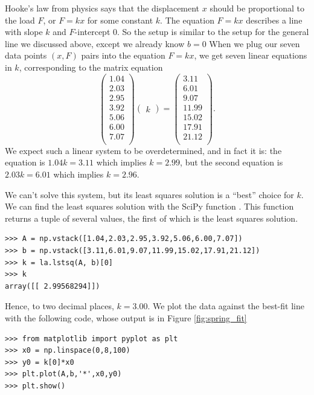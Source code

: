 Hooke's law from physics says that the displacement $x$ should be proportional to the load $F$, or $F = kx$ for some constant $k$.
The equation $F=kx$ describes a line with slope $k$ and $F$-intercept 0.
So the setup is similar to the setup for the general line we discussed above, except we already know $b=0$
When we plug our seven data points $(x,F)$ pairs into the equation $F=kx$, we get seven linear equations in $k$, corresponding to the matrix equation
\[
\begin{pmatrix}
1.04\\
2.03\\
2.95\\
3.92\\
5.06\\
6.00\\
7.07\\
\end{pmatrix}
\begin{pmatrix}k\end{pmatrix} =
\begin{pmatrix}
3.11 \\
6.01\\
9.07\\
11.99\\
15.02\\
17.91\\
21.12\\
\end{pmatrix}.
\]
We expect such a linear system to be overdetermined, and in fact it is: the equation is $1.04k = 3.11$ which implies $k=2.99$, but the second equation is $2.03k = 6.01$ which implies $k=2.96$.

We can't solve this system, but its least squares solution is a ``best'' choice for $k$.
We can find the least squares solution with the SciPy function . 
This function returns a tuple of several values, the first of which is the least squares solution.
\begin{lstlisting}
>>> A = np.vstack([1.04,2.03,2.95,3.92,5.06,6.00,7.07])
>>> b = np.vstack([3.11,6.01,9.07,11.99,15.02,17.91,21.12])
>>> k = la.lstsq(A, b)[0]
>>> k
array([[ 2.99568294]])
\end{lstlisting}
Hence, to two decimal places, $k = 3.00$.
We plot the data against the best-fit line with the following code, whose output is in Figure \ref{fig:spring_fit}


\begin{lstlisting}
>>> from matplotlib import pyplot as plt
>>> x0 = np.linspace(0,8,100)
>>> y0 = k[0]*x0
>>> plt.plot(A,b,'*',x0,y0)
>>> plt.show()
\end{lstlisting}

